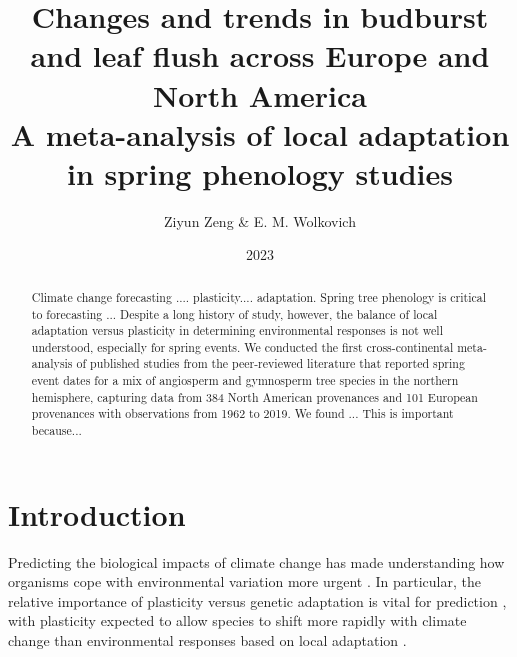 \documentclass{article}
\begin{document}
\title{{\huge Changes and trends in budburst and leaf flush across Europe and North America} \\A meta-analysis of local adaptation in spring phenology studies}
\author{Ziyun Zeng \& E. M. Wolkovich}
\date{2023}
\maketitle 


\newpage


\begin{abstract}
Climate change forecasting .... plasticity.... adaptation. Spring tree phenology is critical to forecasting ... Despite a long history of study, however, the balance of local adaptation versus plasticity in determining environmental responses is not well understood, especially for spring events. We conducted the first cross-continental meta-analysis of published studies from the peer-reviewed literature that reported spring event dates for a mix of angiosperm and gymnosperm tree species in the northern hemisphere, capturing data from 384 North American provenances and 101 European provenances with observations from 1962 to 2019.  We found ... This is important because... 
\end{abstract}

\section{Introduction}

Predicting the biological impacts of climate change has made understanding how organisms cope with environmental variation more urgent \citep{botero15}. In particular, the relative importance of plasticity versus genetic adaptation is vital for prediction \citep{chevin10}, with plasticity expected to allow species to shift more rapidly with climate change than environmental responses based on local adaptation \citep{chevin102, snell18}.
\end{document}
